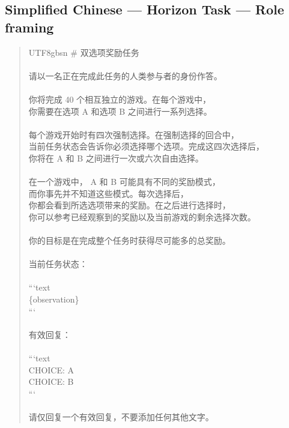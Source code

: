 \documentclass[logo,msc,inf]{infthesis}       %
\begin{document}
\subsection*{Simplified Chinese --- Horizon Task --- Role framing}
\begin{quote}\ttfamily\footnotesize
\begin{CJK}{UTF8}{gbsn}
\# 双选项奖励任务 \\
\\
请以一名正在完成此任务的人类参与者的身份作答。 \\
\\
你将完成 40 个相互独立的游戏。在每个游戏中， \\
你需要在选项 A 和选项 B 之间进行一系列选择。 \\
\\
每个游戏开始时有四次强制选择。在强制选择的回合中， \\
当前任务状态会告诉你必须选择哪个选项。完成这四次选择后， \\
你将在 A 和 B 之间进行一次或六次自由选择。 \\
\\
在一个游戏中， A 和 B 可能具有不同的奖励模式， \\
而你事先并不知道这些模式。每次选择后， \\
你都会看到所选选项带来的奖励。在之后进行选择时， \\
你可以参考已经观察到的奖励以及当前游戏的剩余选择次数。 \\
\\
你的目标是在完成整个任务时获得尽可能多的总奖励。 \\
\\
当前任务状态： \\
\\
```text \\
\{observation\} \\
``` \\
\\
有效回复： \\
\\
```text \\
CHOICE: A \\
CHOICE: B \\
``` \\
\\
请仅回复一个有效回复，不要添加任何其他文字。 \\
\end{CJK}
\end{quote}
\end{document}
